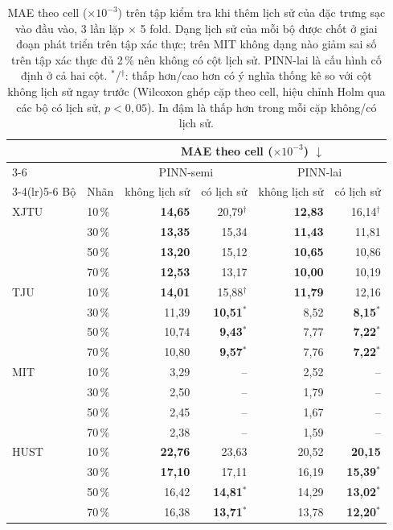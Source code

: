 \begin{table}[!htbp]\centering\small
\caption[Thêm lịch sử của cell vào đầu vào]{MAE theo cell ($\times10^{-3}$) trên tập kiểm tra khi thêm lịch sử của đặc trưng sạc vào đầu vào, 3 lần lặp $\times$ 5 fold. Dạng lịch sử của mỗi bộ được chốt ở giai đoạn phát triển trên tập xác thực; trên MIT không dạng nào giảm sai số trên tập xác thực đủ 2\,\% nên không có cột lịch sử. PINN-lai là cấu hình cố định ở cả hai cột. $^{*}$/$^{\dagger}$: thấp hơn/cao hơn có ý nghĩa thống kê so với cột không lịch sử ngay trước (Wilcoxon ghép cặp theo cell, hiệu chỉnh Holm qua các bộ có lịch sử, $p < 0{,}05$). In đậm là thấp hơn trong mỗi cặp không/có lịch sử.}\label{tab:hist}
\begin{tabular}{llrrrr}\toprule
 & & \multicolumn{4}{c}{MAE theo cell ($\times10^{-3}$) $\downarrow$} \\\cmidrule(lr){3-6}
 & & \multicolumn{2}{c}{PINN-semi} & \multicolumn{2}{c}{PINN-lai} \\\cmidrule(lr){3-4}\cmidrule(lr){5-6}
Bộ & Nhãn & không lịch sử & có lịch sử & không lịch sử & có lịch sử \\\midrule
XJTU & 10\,\% & \textbf{14{,}65} & 20{,}79$^{\dagger}$ & \textbf{12{,}83} & 16{,}14$^{\dagger}$ \\
 & 30\,\% & \textbf{13{,}35} & 15{,}34 & \textbf{11{,}43} & 11{,}81 \\
 & 50\,\% & \textbf{13{,}20} & 15{,}12 & \textbf{10{,}65} & 10{,}86 \\
 & 70\,\% & \textbf{12{,}53} & 13{,}17 & \textbf{10{,}00} & 10{,}19 \\
TJU & 10\,\% & \textbf{14{,}01} & 15{,}88$^{\dagger}$ & \textbf{11{,}79} & 12{,}16 \\
 & 30\,\% & 11{,}39 & \textbf{10{,}51}$^{*}$ & 8{,}52 & \textbf{8{,}15}$^{*}$ \\
 & 50\,\% & 10{,}74 & \textbf{9{,}43}$^{*}$ & 7{,}77 & \textbf{7{,}22}$^{*}$ \\
 & 70\,\% & 10{,}80 & \textbf{9{,}57}$^{*}$ & 7{,}76 & \textbf{7{,}22}$^{*}$ \\
MIT & 10\,\% & 3{,}29 & -- & 2{,}52 & -- \\
 & 30\,\% & 2{,}50 & -- & 1{,}79 & -- \\
 & 50\,\% & 2{,}45 & -- & 1{,}67 & -- \\
 & 70\,\% & 2{,}38 & -- & 1{,}59 & -- \\
HUST & 10\,\% & \textbf{22{,}76} & 23{,}63 & 20{,}52 & \textbf{20{,}15} \\
 & 30\,\% & \textbf{17{,}10} & 17{,}11 & 16{,}19 & \textbf{15{,}39}$^{*}$ \\
 & 50\,\% & 16{,}42 & \textbf{14{,}81}$^{*}$ & 14{,}29 & \textbf{13{,}02}$^{*}$ \\
 & 70\,\% & 16{,}38 & \textbf{13{,}71}$^{*}$ & 13{,}78 & \textbf{12{,}20}$^{*}$ \\
\bottomrule\end{tabular}\end{table}


